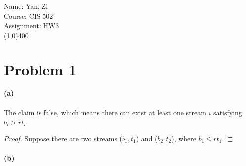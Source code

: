 \documentclass[letter,12pt]{article}
\begin{document}
Name: Yan, Zi \\
Course: CIS 502 \\
Assignment: HW3 \\
\line(1,0){400}

\section*{Problem 1}
\paragraph*{(a)}
The claim is false, which means there can exist at least one stream $i$
satisfying $b_i > rt_i$.

\begin{proof}
Suppose there are two streams ($b_1, t_1$) and ($b_2, t_2$), where
$b_1 \le rt_1$.
\end{proof}

\paragraph*{(b)}
\end{document}
